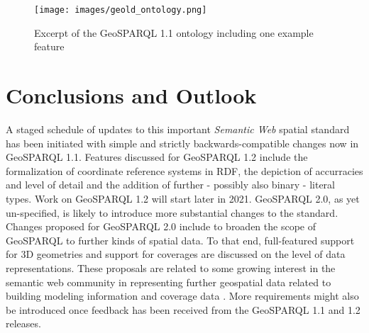 \documentclass[runningheads]{llncs}
\begin{document}
\begin{figure}[htb]
    \centering
    \texttt{[image: images/geold\_ontology.png]}
    \caption{Excerpt of the GeoSPARQL 1.1 ontology including one example feature}
    \label{fig:geosparql11ontology}
\end{figure}

\section{Conclusions and Outlook}\label{sec:conclusions}
A staged schedule of updates to this important \textit{Semantic Web} spatial standard has been initiated with simple and strictly backwards-compatible changes now in GeoSPARQL 1.1. Features discussed for GeoSPARQL 1.2 include the formalization of coordinate reference systems in RDF, the depiction of accurracies and level of detail and the addition of further - possibly also binary - literal types. Work on GeoSPARQL 1.2 will start later in 2021. GeoSPARQL 2.0, as yet un-specified, is likely to introduce more substantial changes to the standard. Changes proposed for GeoSPARQL 2.0 include to broaden the scope of GeoSPARQL to further kinds of spatial data. To that end, full-featured support for 3D geometries and support for coverages are discussed on the level of data representations. These proposals are related to some growing interest in the semantic web community in representing further geospatial data related to building modeling information \cite{zhang2018bimsparql} and coverage data \cite{homburg2020geosparql+}. More requirements might also be introduced once feedback has been received from the GeoSPARQL 1.1 and 1.2 releases.

%
%
%


%




\end{document}
